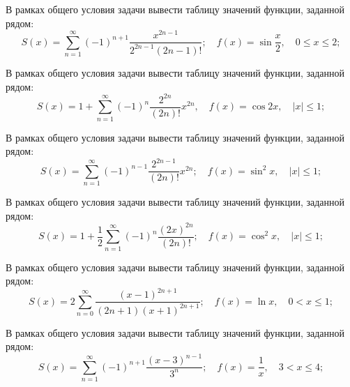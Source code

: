 \begin{zztask}
В рамках общего условия задачи вывести таблицу значений функции, заданной рядом:
\[ %
	S(x)= \sum_{n=1}^\infty (-1)^{n+1} \frac{x^{2n-1}}{2^{2n-1}(2n-1)!};\quad
	f(x)= \sin \frac{x}{2},
	\quad 0 \leq x \leq 2;
\]
\end{zztask}


\begin{zztask}
В рамках общего условия задачи вывести таблицу значений функции, заданной рядом:
\[ %
  S(x)= 1 + \sum_{n=1}^\infty (-1)^n \frac{2^{2n}}{(2n)!} x^{2n},\quad
  f(x)= \cos 2x,
  \quad |x| \leq 1;
\]
\end{zztask}


\begin{zztask}
В рамках общего условия задачи вывести таблицу значений функции, заданной рядом:
\[ %
  S(x)= \sum_{n=1}^\infty (-1)^{n-1} \frac{2^{2n-1}}{(2n)!} x^{2n};\quad
  f(x)= \sin^2 x,
  \quad |x| \leq 1;
\]
\end{zztask}


\begin{zztask}
В рамках общего условия задачи вывести таблицу значений функции, заданной рядом:
\[ %
  S(x)= 1 + \frac{1}{2} \sum_{n=1}^\infty (-1)^n \frac{(2x)^{2n}}{(2n)!};\quad
  f(x)= \cos^2 x,
  \quad |x| \leq 1;
\]
\end{zztask}


\begin{zztask}
В рамках общего условия задачи вывести таблицу значений функции, заданной рядом:
\[
  S(x)= 2 \sum_{n=0}^\infty \frac{(x-1)^{2n+1}}{(2n+1)(x+1)^{2n+1}};\quad
  f(x)= \ln x,
  \quad 0 < x \leq 1;
\]
\end{zztask}


\begin{zztask}
В рамках общего условия задачи вывести таблицу значений функции, заданной рядом:
\[
  S(x)= \sum_{n=1}^\infty (-1)^{n+1}\frac{(x-3)^{n-1}}{3^n};\quad
  f(x)= \frac{1}{x},
  \quad 3 < x \leq 4;
\]
\end{zztask}

